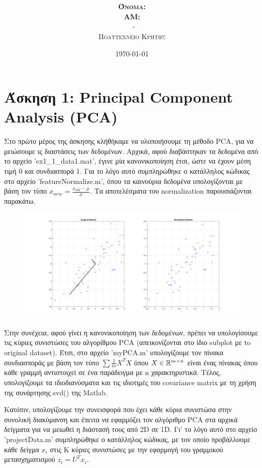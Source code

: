 \documentclass{article}
\title{\underline{\textbf{\assignmentNumber}}}
\author{\textsc{\textbf{Όνομα:}}  \studentName\\
		\textsc{\textbf{ΑΜ:}}  \studentNumber\\
		\course \ - \courseName\\ 
		\textsc{Πολυτεχνείο Κρήτης}
}
\date{\today}
\begin{document}
	\maketitle
\section*{Άσκηση 1: Principal Component Analysis (PCA)}
	Στο πρώτο μέρος της άσκησης κλήθήκαμε να υλοποιήσουμε τη μέθοδο PCA, για να μειώσουμε ις διαστάσεις των δεδομένων. Αρχικά, αφού διαβάστηκαν τα δεδομένα από το αρχείο 'ex1\_1\_data1.mat', έγινε μία κανονικοποίηση έτσι, ώστε να έχουν μέση τιμή 0 και συνδιασπορά 1. Για το λόγο αυτό συμπληρώθηκε ο κατάλληλος κώδικας στο αρχείο 'featureNormalize.m', όπου τα καινούρια δεδομένα υπολογίζονται με βάση τον τύπο $x_{new} = \frac{x_{old} - μ}{σ}$. Τα αποτελέσματα του normalization παρουσιάζονται παρακάτω.
	
	\begin{figure}[h!]
		\centering
		\includegraphics[width=\linewidth]{../exercise1_1/images/original_normalized_dataset.png}
	\end{figure}
	
	\noindent
	Στην συνέχεια, αφού γίνει η κανονικοποίηση των δεδομένων, πρέπει να υπολογίσουμε τις κύριες συνιστώσες του αλγορίθμου PCA (απεικονίζονται στο ίδιο subplot με τo original dataset). Έτσι, στο αρχείο 'myPCA.m' υπολογίζουμε τον πίνακα συνδιασποράς με βάση τον τύπο $\sum \frac{1}{m} X^{T}X$ όπου $X \in \Bbb R^{m \times n}$ είναι ένας πίνακας όπου κάθε γραμμή αντιστοιχεί σε ένα παράδειγμα με n χαρακτηριστικά. Tέλος, υπολογίζουμε τα ιδιοδιανύσματα και τις ιδιοτιμές του covariance matrix με τη χρήση της συνάρτησης svd() της Matlab.
	
	\noindent
	Κατόπιν, υπολογίζουμε την συνεισφορά που έχει κάθε κύρια συνιστώσα στην συνολική διακύμανση και
	έπειτα να εφαρμόζει τον αλγόριθμο PCA στα αρχικά δείγματα για να μειωθεί η διάστασή τους από 2D σε 1D. Γι' το λόγο αυτό στο αρχείο 'projectData.m' συμπληρώθηκε ο κατάλληλος κώδικας, με τον οποίο προβάλλουμε κάθε δείγμα $x_{i}$ στις Κ κύριες συνιστώσες με την εφαρμογή του
	γραμμικού μετασχηματισμού $z_{i} = U^{T}x_{i}$. 
	
\end{document}
